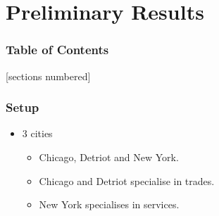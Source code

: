 \documentclass[serif, 9pt, aspectratio=32]{beamer}
\begin{document}
\section{Preliminary Results}

\begin{frame}
    \frametitle{Table of Contents}
    [sections numbered]
    \tableofcontents[currentsection]
\end{frame}

\begin{frame}
    \centering
    \frametitle{Setup}
    \begin{itemize}
        \setlength{\itemsep}{3em}
        \item 3 cities
              \begin{itemize}
                  \setlength{\itemsep}{1em}
                  \item Chicago, Detriot and New York.
                  \item Chicago and Detriot specialise in trades.
                  \item New York specialises in services.
              \end{itemize}
    \end{itemize}
\end{frame}
\end{document}
